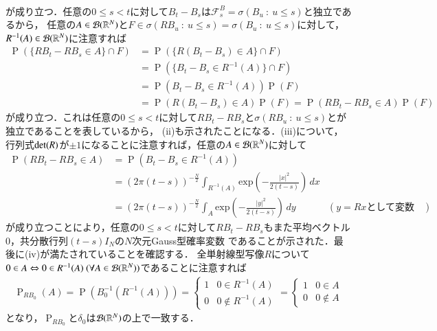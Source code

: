 \begin{prf}
\begin{description}
\begin{align}
		\end{align}
		が成り立つ．任意の$0 \leq s < t$に対して$B_t - B_s$は$\mathcal{F}_s^B = \sigma(B_u\ :\ u \leq s)$と独立であるから，
		任意の$A \in \mathcal{B}(\mathbb{R}^N)$と$F \in \sigma(RB_u\ :\ u \leq s) = \sigma(B_u\ :\ u \leq s)$に対して，
		$R^{-1}(A) \in \mathcal{B}(\mathbb{R}^N)$に注意すれば
		\begin{align}
			\operatorname{P}\left(\{RB_t - RB_s \in A\} \cap F \right) 
			&= \operatorname{P}\left(\{R(B_t - B_s) \in A\} \cap F \right) \\
			&= \operatorname{P}\left(\{B_t - B_s \in R^{-1}(A)\} \cap F \right) \\
			&= \operatorname{P}\left(B_t - B_s \in R^{-1}(A)\right)\operatorname{P}(F) \\
			&= \operatorname{P}\left(R(B_t - B_s) \in A\right)\operatorname{P}(F)
			= \operatorname{P}\left(RB_t - RB_s \in A\right)\operatorname{P}(F)
		\end{align}
		が成り立つ．これは任意の$0 \leq s < t$に対して$RB_t - RB_s$と$\sigma(RB_u\ :\ u \leq s)$とが独立であることを表しているから，
		(ii)も示されたことになる．(iii)について，行列式$\operatorname{det} ( R )$が$\pm 1$になることに注意すれば，任意の$A \in \mathcal{B}(\mathbb{R}^N)$に対して
		\begin{align}
			\operatorname{P}(RB_t - RB_s \in A) &= \operatorname{P}\left(B_t - B_s \in R^{-1}(A)\right) \\
			&= (2\pi(t-s))^{-\frac{N}{2}} \int_{R^{-1}(A)} \mathrm{exp}\left( -\frac{|x|^2}{2(t-s)} \right)\, dx \\
			&= (2\pi(t-s))^{-\frac{N}{2}} \int_{A} \mathrm{exp}\left( -\frac{|y|^2}{2(t-s)} \right)\, dy & \left(y = Rx\mbox{として変数変換}\right)
		\end{align}
		が成り立つことにより，任意の$0 \leq s < t$に対して$RB_t - RB_s$もまた平均ベクトル0，共分散行列$(t-s)I_N$の$N$次元Gauss型確率変数
		であることが示された．最後に(iv)が満たされていることを確認する．
		全単射線型写像$R$について$0 \in A \Leftrightarrow 0 \in R^{-1}(A)\ (\forall A \in \mathcal{B}(\mathbb{R}^N))$であることに注意すれば
		\begin{align}
			\operatorname{P}_{RB_0}(A) 
			= \operatorname{P}\left(B_0^{-1}\left(R^{-1}(A)\right)\right) 
			= \begin{cases}
				1 & 0 \in R^{-1}(A) \\
				0 & 0 \notin R^{-1}(A)
			\end{cases}
			= \begin{cases}
				1 & 0 \in A \\
				0 & 0 \notin A
			\end{cases}
		\end{align}
		となり，$\operatorname{P}_{RB_0}$と$\delta_0$は$\mathcal{B}(\mathbb{R}^N)$の上で一致する．
	

\end{description}
\end{prf}
